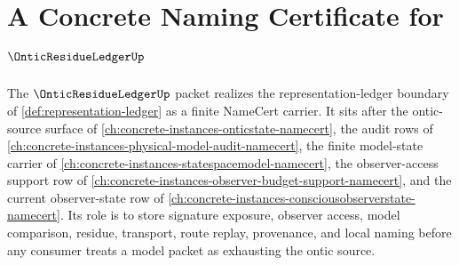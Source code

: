 \chapter{A Concrete Naming Certificate for $\OnticResidueLedgerUp$}
\label{ch:concrete-instances-ontic-residue-ledger-namecert}

The $\OnticResidueLedgerUp$ packet realizes the representation-ledger boundary of \autoref{def:representation-ledger} as a finite NameCert carrier. It sits after the ontic-source surface of \autoref{ch:concrete-instances-onticstate-namecert}, the audit rows of \autoref{ch:concrete-instances-physical-model-audit-namecert}, the finite model-state carrier of \autoref{ch:concrete-instances-statespacemodel-namecert}, the observer-access support row of \autoref{ch:concrete-instances-observer-budget-support-namecert}, and the current observer-state row of \autoref{ch:concrete-instances-consciousobserverstate-namecert}. Its role is to store signature exposure, observer access, model comparison, residue, transport, route replay, provenance, and local naming before any consumer treats a model packet as exhausting the ontic source.

